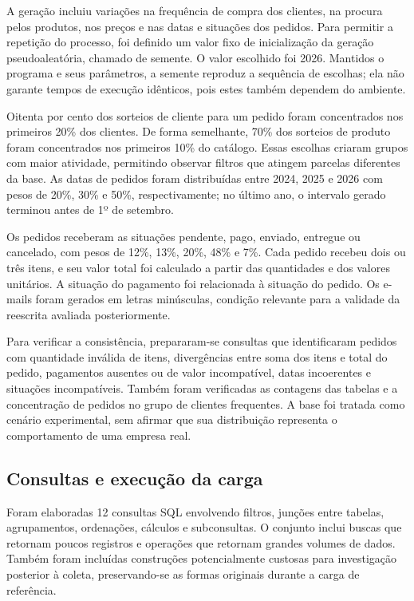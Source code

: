 \documentclass{UNESC}
\begin{document}
A geração incluiu variações na frequência de compra dos clientes, na procura pelos produtos, nos preços e nas datas e situações dos pedidos. Para permitir a repetição do processo, foi definido um valor fixo de inicialização da geração pseudoaleatória, chamado de semente. O valor escolhido foi 2026. Mantidos o programa e seus parâmetros, a semente reproduz a sequência de escolhas; ela não garante tempos de execução idênticos, pois estes também dependem do ambiente.

Oitenta por cento dos sorteios de cliente para um pedido foram concentrados nos primeiros 20\% dos clientes. De forma semelhante, 70\% dos sorteios de produto foram concentrados nos primeiros 10\% do catálogo. Essas escolhas criaram grupos com maior atividade, permitindo observar filtros que atingem parcelas diferentes da base. As datas de pedidos foram distribuídas entre 2024, 2025 e 2026 com pesos de 20\%, 30\% e 50\%, respectivamente; no último ano, o intervalo gerado terminou antes de 1º de setembro.

Os pedidos receberam as situações pendente, pago, enviado, entregue ou cancelado, com pesos de 12\%, 13\%, 20\%, 48\% e 7\%. Cada pedido recebeu dois ou três itens, e seu valor total foi calculado a partir das quantidades e dos valores unitários. A situação do pagamento foi relacionada à situação do pedido. Os e-mails foram gerados em letras minúsculas, condição relevante para a validade da reescrita avaliada posteriormente.

Para verificar a consistência, prepararam-se consultas que identificaram pedidos com quantidade inválida de itens, divergências entre soma dos itens e total do pedido, pagamentos ausentes ou de valor incompatível, datas incoerentes e situações incompatíveis. Também foram verificadas as contagens das tabelas e a concentração de pedidos no grupo de clientes frequentes. A base foi tratada como cenário experimental, sem afirmar que sua distribuição representa o comportamento de uma empresa real.

\subsection{Consultas e execução da carga}

Foram elaboradas 12 consultas SQL envolvendo filtros, junções entre tabelas, agrupamentos, ordenações, cálculos e subconsultas. O conjunto inclui buscas que retornam poucos registros e operações que retornam grandes volumes de dados. Também foram incluídas construções potencialmente custosas para investigação posterior à coleta, preservando-se as formas originais durante a carga de referência.
\end{document}
